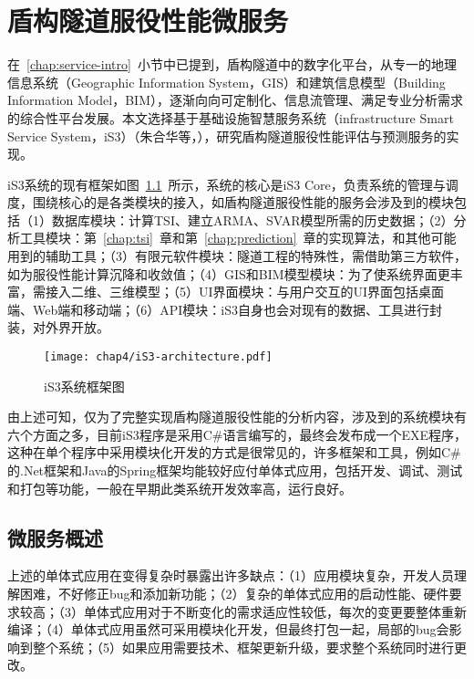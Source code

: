 \chapter{盾构隧道服役性能微服务}
\label{chap:service}

在~\ref{chap:service-intro}~小节中已提到，盾构隧道中的数字化平台，从专一的地理信息系统（Geographic Information System，GIS）和建筑信息模型（Building Information Model，BIM），逐渐向向可定制化、信息流管理、满足专业分析需求的综合性平台发展。本文选择基于基础设施智慧服务系统（infrastructure Smart Service System，iS3）（朱合华等，\citeyear{朱合华2018智慧基础设施}），研究盾构隧道服役性能评估与预测服务的实现。

iS3系统的现有框架如图~\ref{fig:iS3系统框架图}~所示，系统的核心是iS3 Core，负责系统的管理与调度，围绕核心的是各类模块的接入，如盾构隧道服役性能的服务会涉及到的模块包括（1）数据库模块：计算TSI、建立ARMA、SVAR模型所需的历史数据；（2）分析工具模块：第~\ref{chap:tsi}~章和第~\ref{chap:prediction}~章的实现算法，和其他可能用到的辅助工具；（3）有限元软件模块：隧道工程的特殊性，需借助第三方软件，如为服役性能计算沉降和收敛值；（4）GIS和BIM模型模块：为了使系统界面更丰富，需接入二维、三维模型；（5）UI界面模块：与用户交互的UI界面包括桌面端、Web端和移动端；（6）API模块：iS3自身也会对现有的数据、工具进行封装，对外界开放。

\begin{figure}[htb!]
    \centering
    \texttt{[image: chap4/iS3-architecture.pdf]}
    \caption{iS3系统框架图}
    \label{fig:iS3系统框架图}
\end{figure}

由上述可知，仅为了完整实现盾构隧道服役性能的分析内容，涉及到的系统模块有六个方面之多，目前iS3程序是采用C\#语言编写的，最终会发布成一个EXE程序，这种在单个程序中采用模块化开发的方式是很常见的，许多框架和工具，例如C\#的.Net框架和Java的Spring框架均能较好应付单体式应用，包括开发、调试、测试和打包等功能，一般在早期此类系统开发效率高，运行良好。

\section{微服务概述}

上述的单体式应用在变得复杂时暴露出许多缺点：（1）应用模块复杂，开发人员理解困难，不好修正bug和添加新功能；（2）复杂的单体式应用的启动性能、硬件要求较高；（3）单体式应用对于不断变化的需求适应性较低，每次的变更要整体重新编译；（4）单体式应用虽然可采用模块化开发，但最终打包一起，局部的bug会影响到整个系统；（5）如果应用需要技术、框架更新升级，要求整个系统同时进行更改。

